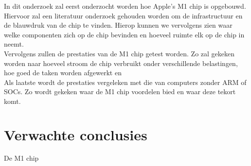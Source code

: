 \documentclass{hogent-article}
\begin{document}

In dit onderzoek zal eerst onderzocht worden hoe Apple's M1 chip is opgebouwd. Hiervoor zal een literatuur onderzoek gehouden worden om de infrastructuur en de blauwdruk van de chip te vinden. Hierop kunnen we vervolgens zien waar welke componenten zich op de chip bevinden en hoeveel ruimte elk op de chip in neemt. \\
Vervolgens zullen de prestaties van de M1 chip getest worden. Zo zal gekeken worden naar hoeveel stroom de chip verbruikt onder verschillende belastingen, hoe goed de taken worden afgewerkt en  \\
Als laatste wordt de prestaties vergeleken met die van computers zonder ARM of SOCs. Zo wordt gekeken waar de M1 chip voordelen bied en waar deze tekort komt.

\section{Verwachte conclusies}


De M1 chip


\printbibliography[heading=bibintoc]
\end{document}
